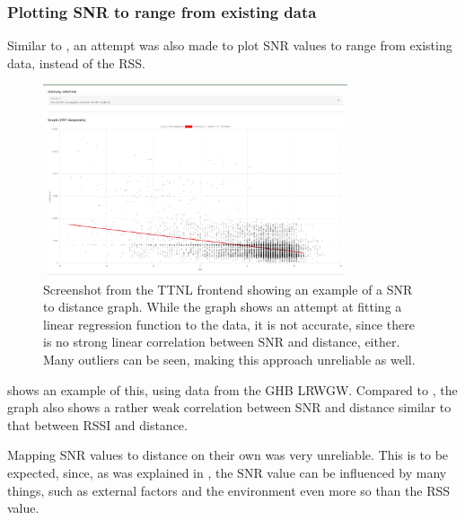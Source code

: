 \subsubsection{Plotting \acl{SNR} to range from existing data}\label{sec:plotting-snr-to-range-from-existing-data}

Similar to , an attempt was also made to plot \ac{SNR} values to range from existing data, instead of the \ac{RSS}.

\begin{figure}[htbp]
    \centering
    \includegraphics[width=0.8\textwidth]{pictures/ttn-locator/frontend/data/gateway_ghb_snr_range_graph.jpg}
    \caption[Screenshot from the \acl{TTNL} frontend showing an example of a \acl{SNR} to distance graph]{
        Screenshot from the \ac{TTNL} frontend showing an example of a \acf{SNR} to distance graph.
        While the graph shows an attempt at fitting a linear regression function to the data, it is not accurate, since there is no strong linear correlation between \ac{SNR} and distance, either.
        Many outliers can be seen, making this approach unreliable as well.
    }\label{fig:snr-range-graph-example}
\end{figure}

 shows an example of this, using data from the \ac{GHB} \acl{LRWGW}.
Compared to , the graph also shows a rather weak correlation between \ac{SNR} and distance similar to that between \ac{RSSI} and distance.

Mapping \ac{SNR} values to distance on their own was very unreliable.
This is to be expected, since, as was explained in , the \ac{SNR} value can be influenced by many things, such as external factors and the environment even more so than the \ac{RSS} value.

